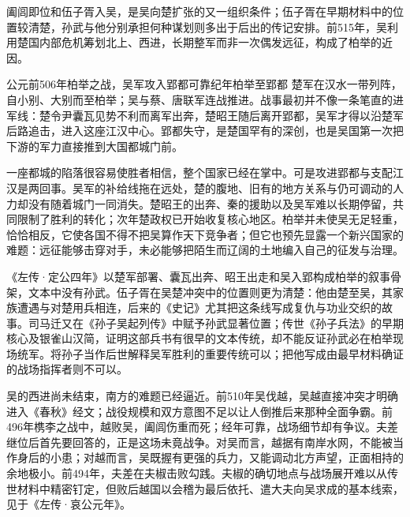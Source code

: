 阖闾即位和伍子胥入吴，是吴向楚扩张的又一组织条件；伍子胥在早期材料中的位置较清楚，孙武与他分别承担何种谋划则多出于后出的传记安排。前515年，吴利用楚国内部危机筹划北上、西进，长期整军而非一次偶发远征，构成了柏举的近因。

\begin{event}{公元前506年}{柏举之战，吴军攻入郢都}{可靠纪年}{柏举至郢都}
楚军在汉水一带列阵，自小别、大别而至柏举；吴与蔡、唐联军连战推进。战事最初并不像一条笔直的进军线：楚令尹囊瓦见势不利而离军出奔，楚昭王随后离开郢都，吴军才得以沿楚军后路追击，进入这座江汉中心。郢都失守，是楚国罕有的深创，也是吴国第一次把下游的军力直接推到大国都城门前。
\end{event}

一座都城的陷落很容易使胜者相信，整个国家已经在掌中。可是攻进郢都与支配江汉是两回事。吴军的补给线拖在远处，楚的腹地、旧有的地方关系与仍可调动的人力却没有随着城门一同消失。楚昭王的出奔、秦的援助以及吴军难以长期停留，共同限制了胜利的转化；次年楚政权已开始收复核心地区。柏举并未使吴无足轻重，恰恰相反，它使各国不得不把吴算作天下竞争者；但它也预先显露一个新兴国家的难题：远征能够击穿对手，未必能够把陌生而辽阔的土地编入自己的征发与治理。

\begin{textwindow}[柏举、伍子胥与孙子的名字]
《左传·定公四年》以楚军部署、囊瓦出奔、昭王出走和吴入郢构成柏举的叙事骨架，文本中没有孙武。伍子胥在吴楚冲突中的位置则更为清楚：他由楚至吴，其家族遭遇与对楚用兵相连，后来的《史记》尤其把这条线写成复仇与功业交织的故事。司马迁又在《孙子吴起列传》中赋予孙武显著位置；传世《孙子兵法》的早期核心及银雀山汉简，证明这部兵书有很早的文本传统，却不能反证孙武必在柏举现场统军。将孙子当作后世解释吴军胜利的重要传统可以；把他写成由最早材料确证的战场指挥者则不可以。
\end{textwindow}

吴的西进尚未结束，南方的难题已经逼近。前510年吴伐越，吴越直接冲突才明确进入《春秋》经文；战役规模和双方意图不足以让人倒推后来那种全面争霸。前496年槜李之战中，越败吴，阖闾伤重而死；经年可靠，战场细节却有争议。夫差继位后首先要回答的，正是这场未竟战争。对吴而言，越据有南岸水网，不能被当作身后的小患；对越而言，吴既握有更强的兵力，又能调动北方声望，正面相持的余地极小。前494年，夫差在夫椒击败勾践。夫椒的确切地点与战场展开难以从传世材料中精密钉定，但败后越国以会稽为最后依托、遣大夫向吴求成的基本线索，见于《左传·哀公元年》。

